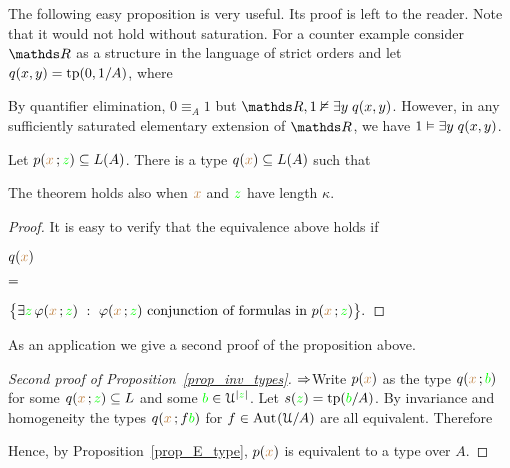 \documentclass[creche.tex]{subfiles}
\begin{document}
The following easy proposition is very useful.
Its proof is left to the reader.
Note that it would not hold without saturation.
For a counter example consider $\RR$ as a structure in the language of strict orders and let $q(x,y)={\rm tp}(0,1/A)$, where 


By quantifier elimination, $0\equiv_{A}1$ but $\RR,1\notmodels\E y\;q(x,y)$.
However, in any sufficiently saturated elementary extension of $\RR$, we have $1\vDash\exists y\;q(x,y)$.


\begin{proposition}\label{prop_E_type}
Let $p({\color{brown} x}\,;{\color{green} z})\subseteq L(A)$.
There is a type $q({\color{brown} x})\subseteq L(A)$ such that


The theorem holds also when ${\color{brown} x}$ and ${\color{green} z}$ have length $\kappa$.
\end{proposition}

\begin{proof}
  It is easy to verify that the equivalence above holds if
  \def\medrel#1{\parbox{6ex}{$\displaystyle\hfil #1$}}
  \def\ceq#1#2#3{\parbox[b]{10ex}{$\displaystyle #1$}\medrel{#2}$\displaystyle  #3$}

  \ceq{\hfill q({\mr x})}{=}{\big\{ \E {\gr z}\,\phi({\mr x}\,;{\gr z})\ :\ \phi({\mr x}\,;{\gr z}) \textrm{ conjunction of formulas in } p({\mr x}\,;{\gr z}) \big\}.}
\end{proof}
As an application we give a second proof of the proposition above.

\begin{proof}[Second proof of Proposition~\ref{prop_inv_types}] $\Rightarrow$\quad  Write $p({\color{brown} x})$ as the type $q({\color{brown} x}\,;{\color{green} b})$ for some $q({\color{brown} x}\,;{\color{green} z})\subseteq L$ and some ${\color{green} b}\in\EuScript U^{|{\color{green} z}|}$.
Let $s({\color{green} z})={\rm tp}({\color{green} b}/A)$.
By invariance and homogeneity the types $q({\color{brown} x}\,;f{\color{green} b})$ for $f\in{\rm Aut\kern.15ex}(\EuScript U/A)$ are all equivalent.
Therefore

\smallskip

\smallskip

\smallskip

Hence, by Proposition~\ref{prop_E_type}, $p({\color{brown} x})$ is equivalent to a type over $A$.
\end{proof}
\end{document}
